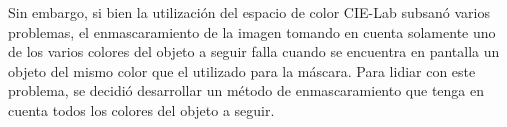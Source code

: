 Sin embargo, si bien la utilización del espacio de color CIE-Lab subsanó varios problemas, el enmascaramiento de la imagen tomando en cuenta solamente uno de los varios colores del objeto a seguir falla cuando se encuentra en pantalla un objeto del mismo color que el utilizado para la máscara. Para lidiar con este problema, se decidió desarrollar un método de enmascaramiento que tenga en cuenta todos los colores del objeto a seguir.





















